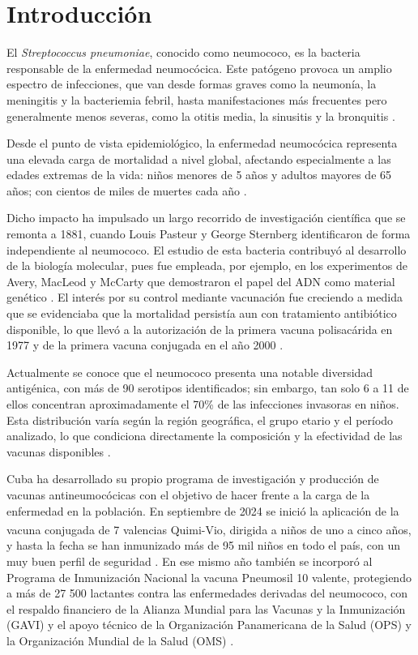 \chapter*{Introducción}\label{chapter:introduction}

El \textit{Streptococcus pneumoniae}, conocido como neumococo, es la bacteria responsable de la enfermedad neumocócica. Este patógeno provoca un amplio espectro de infecciones, que van desde formas graves como la neumonía, la meningitis y la bacteriemia febril, hasta manifestaciones más frecuentes pero generalmente menos severas, como la otitis media, la sinusitis y la bronquitis \cite{cdc_pneumococica_2026, who_pneumococcal_2026, cdc_pneumococica_2024}.

Desde el punto de vista epidemiológico, la enfermedad neumocócica representa una elevada carga de mortalidad a nivel global, afectando especialmente a las edades extremas de la vida: niños menores de 5 años y adultos mayores de 65 años; con cientos de miles de muertes cada año \cite{who_pneumococcal_2026}. 

Dicho impacto ha impulsado un largo recorrido de investigación científica que se remonta a 1881, cuando Louis Pasteur y George Sternberg identificaron de forma independiente al neumococo. El estudio de esta bacteria contribuyó al desarrollo de la biología molecular, pues fue empleada, por ejemplo, en los experimentos de Avery, MacLeod y McCarty que demostraron el papel del ADN como material genético \cite{Neumoexpertos2016}. El interés por su control mediante vacunación fue creciendo a medida que se evidenciaba que la mortalidad persistía aun con tratamiento antibiótico disponible, lo que llevó a la autorización de la primera vacuna polisacárida en 1977 y de la primera vacuna conjugada en el año 2000 \cite{cdc_pneumococica_2024}.

Actualmente se conoce que el neumococo presenta una notable diversidad antigénica, con más de 90 serotipos identificados; sin embargo, tan solo 6 a 11 de ellos concentran aproximadamente el 70\% de las infecciones invasoras en niños. Esta distribución varía según la región geográfica, el grupo etario y el período analizado, lo que condiciona directamente la composición y la efectividad de las vacunas disponibles \cite{who_pneumococcal_2026, paho_neumococo_2026}.

Cuba ha desarrollado su propio programa de investigación y producción de vacunas antineumocócicas con el objetivo de hacer frente a la carga de la enfermedad en la población. En septiembre de 2024 se inició la aplicación de la vacuna conjugada de 7 valencias Quimi-Vio\textsuperscript{\textregistered}, dirigida a niños de uno a cinco años, y hasta la fecha se han inmunizado más de 95 mil niños en todo el país, con un muy buen perfil de seguridad \cite{prensa2025neumo11}. En ese mismo año también se incorporó al Programa de Inmunización Nacional la vacuna Pneumosil 10 valente, protegiendo a más de 27 500 lactantes contra las enfermedades derivadas del neumococo, con el respaldo financiero de la Alianza Mundial para las Vacunas y la Inmunización (GAVI) y el apoyo técnico de la Organización Panamericana de la Salud (OPS) y la Organización Mundial de la Salud (OMS) \cite{dpsalud_pneumosil_2024}. 

